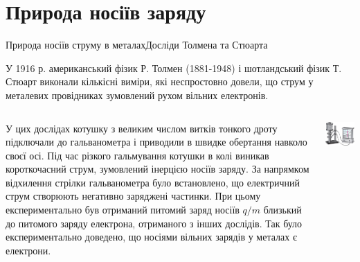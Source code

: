 \documentclass[onlytextwidth]{beamer}
\begin{document}




\section{Природа носіїв заряду}




\begin{frame}{Природа носіїв струму в металах}{Досліди Толмена та Стюарта}\scriptsize
	\begin{block}{}\justifying
		У 1916 р. американський фізик Р. Толмен (1881-1948) і шотландський фізик Т. Стюарт виконали
		кількісні виміри, які неспростовно довели, що струм у металевих провідниках зумовлений рухом
		вільних електронів.
	\end{block}
	\begin{columns}
		\begin{column}{0.65\linewidth}
			\begin{block}{}\justifying
				У цих дослідах котушку з великим числом витків тонкого дроту підключали до гальванометра і
				приводили в швидке обертання навколо своєї осі. Під час різкого гальмування котушки в колі
				виникав короткочасний струм, зумовлений інерцією носіїв заряду. За напрямком відхилення
				стрілки гальванометра було встановлено, що \alert{електричний струм створюють негативно
					заряджені частинки}. При цьому експериментально був отриманий питомий заряд носіїв $q/m$
				близький до питомого заряду електрона, отриманого з інших дослідів. Так було експериментально
				доведено, що носіями вільних зарядів у металах є електрони.
			\end{block}
		\end{column}
		\hfill
		\begin{column}{0.3\linewidth}\centering
			\includegraphics[width=\linewidth]{exptommstuart}

\end{column}
\end{columns}
\end{frame}
\end{document}
